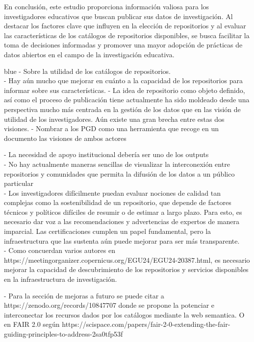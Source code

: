 \documentclass[runningheads]{llncs}
\def \bchgon {\begin{color}{blue}}
\def \echgon {\end{color}}
\begin{document}
En conclusión, este estudio proporciona información valiosa para los investigadores educativos que buscan publicar sus datos de investigación. Al destacar los factores clave que influyen en la elección de repositorios y al evaluar las características de los catálogos de repositorios disponibles, se busca facilitar la toma de decisiones informadas y promover una mayor adopción de prácticas de datos abiertos en el campo de la investigación educativa.\\

\bchgon
- Sobre la utilidad de los catálogos de repositorios.\\
  - Hay aún mucho que mejorar en cuánto a la capacidad de los repositorios para informar sobre sus características.
  - La idea de repositorio como objeto definido, así como el proceso de publicación tiene actualmente ha sido moldeado desde una perspectiva mucho más centrada en la gestión de los datos que en las visión de utilidad de los investigadores. Aún existe una gran brecha entre estas dos visiones.
  - Nombrar a los PGD como una herramienta que recoge en un documento las visiones de ambos actores

- La necesidad de apoyo institucional debería ser uno de los outputs\\

- No hay actualmente maneras sencillas de visualizar la interconexión entre repositorios y comunidades que permita la difusión de los datos a un público particular\\

- Los investigadores difícilmente puedan evaluar nociones de calidad tan complejas como la sostenibilidad de un repositorio, que depende de factores técnicos y políticos difíciles de resumir o de estimar a largo plazo. Para esto, es necesario dar voz a las recomendaciones y advertencias de expertos de manera imparcial. Las certificaciones cumplen un papel fundamental, pero la infraestructura que las sustenta aún puede mejorar para ser más transparente.\\

- Como concuerdan varios autores en https://meetingorganizer.copernicus.org/EGU24/EGU24-20387.html, es necesario mejorar la capacidad de descubrimiento de los repositorios y servicios disponibles en la infraestructura de investigación.

- Para la sección de mejoras a futuro se puede citar a https://zenodo.org/records/10847707 donde se propone la potenciar e interconectar los recursos dados por los catálogos mediante la web semantica. O en FAIR 2.0 según https://scispace.com/papers/fair-2-0-extending-the-fair-guiding-principles-to-address-2sa0tfp53f \\
\echgon



\end{document}
